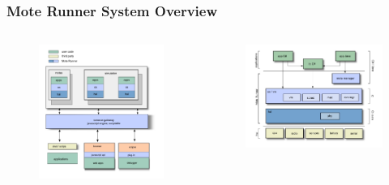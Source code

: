 \begin{frame}[fragile]
  \frametitle{Mote Runner System Overview}
  \begin{columns}
    \begin{column}{.5\linewidth}
    	\begin{figure}
	  \centering
	  \includegraphics[width=\textwidth]{img/overview.jpg}
    	\end{figure}
    \end{column}
    \hfill
    \begin{column}{.5\linewidth}
    	\begin{figure}
	  \centering
	  \includegraphics[width=\textwidth]{img/onmote.jpg}
    	\end{figure}
    \end{column}
  \end{columns}
\end{frame}

